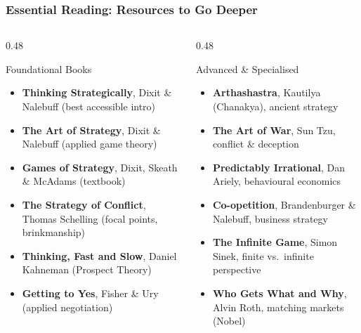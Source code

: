 \begin{frame}[fragile]\frametitle{Essential Reading: Resources to Go Deeper}
  \begin{columns}
    \begin{column}[T]{0.48\linewidth}
      \begin{block}{Foundational Books}
        \begin{itemize}
          \item \textbf{Thinking Strategically}, Dixit \& Nalebuff (best accessible intro)
          \item \textbf{The Art of Strategy}, Dixit \& Nalebuff (applied game theory)
          \item \textbf{Games of Strategy}, Dixit, Skeath \& McAdams (textbook)
          \item \textbf{The Strategy of Conflict}, Thomas Schelling (focal points, brinkmanship)
          \item \textbf{Thinking, Fast and Slow}, Daniel Kahneman (Prospect Theory)
          \item \textbf{Getting to Yes}, Fisher \& Ury (applied negotiation)
        \end{itemize}
      \end{block}
    \end{column}
    \begin{column}[T]{0.48\linewidth}
      \begin{block}{Advanced \& Specialised}
        \begin{itemize}
          \item \textbf{Arthashastra}, Kautilya (Chanakya), ancient strategy
          \item \textbf{The Art of War}, Sun Tzu, conflict \& deception
          \item \textbf{Predictably Irrational}, Dan Ariely, behavioural economics
          \item \textbf{Co-opetition}, Brandenburger \& Nalebuff, business strategy
          \item \textbf{The Infinite Game}, Simon Sinek, finite vs.\ infinite perspective
          \item \textbf{Who Gets What and Why}, Alvin Roth, matching markets (Nobel)
        \end{itemize}
      \end{block}
    \end{column}
  \end{columns}
\end{frame}

